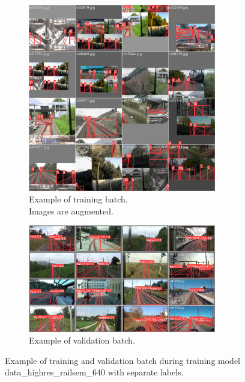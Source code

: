 \documentclass[Master,MDS,english]{BASE/twbook} %
\begin{document}
\begin{figure}
\centering
\begin{subfigure}[t]{.5\textwidth}
  \centering
  \includegraphics[width=0.9\textwidth]{images/yolo/highres_nl/train_batch1}
  \caption{Example of training batch.\\ Images are augmented.}
  \label{fig:mosaic_augmentation_highres_nl}
\end{subfigure}%
\begin{subfigure}[t]{.5\textwidth}
  \centering
  \includegraphics[width=0.9\textwidth]{images/yolo/highres_nl/val_batch1_pred}
  \caption{Example of validation batch. }
\end{subfigure}
\caption{Example of training and validation batch during training model data\_highres\_railsem\_640 with separate labels.}
\label{fig:yolo_highres_example_nl}
\end{figure}
\end{document}
